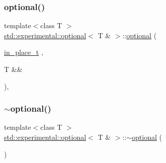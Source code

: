 \mbox{\label{classstd_1_1experimental_1_1optional_3_01_t_01_6_01_4_accb8a2372c834051b76329222d6e737f}} 
\subsubsection{\texorpdfstring{optional()}{optional()}\hspace{0.1cm}{\footnotesize\ttfamily [7/7]}}
{\footnotesize\ttfamily template$<$class T $>$ \\
\hyperlink{classstd_1_1experimental_1_1optional}{std\+::experimental\+::optional}$<$ T \& $>$\+::\hyperlink{classstd_1_1experimental_1_1optional}{optional} (\begin{DoxyParamCaption}\item[{\hyperlink{structstd_1_1experimental_1_1in__place__t}{in\+\_\+place\+\_\+t}}]{,  }\item[{T \&\&}]{ }\end{DoxyParamCaption})\hspace{0.3cm}{\ttfamily [explicit]}, {\ttfamily [delete]}}

\mbox{\label{classstd_1_1experimental_1_1optional_3_01_t_01_6_01_4_a6da1c8d60a81dde58445da2b33430a05}} 
\subsubsection{\texorpdfstring{$\sim$optional()}{~optional()}}
{\footnotesize\ttfamily template$<$class T $>$ \\
\hyperlink{classstd_1_1experimental_1_1optional}{std\+::experimental\+::optional}$<$ T \& $>$\+::$\sim$\hyperlink{classstd_1_1experimental_1_1optional}{optional} (\begin{DoxyParamCaption}{ }\end{DoxyParamCaption})\hspace{0.3cm}{\ttfamily [default]}}



